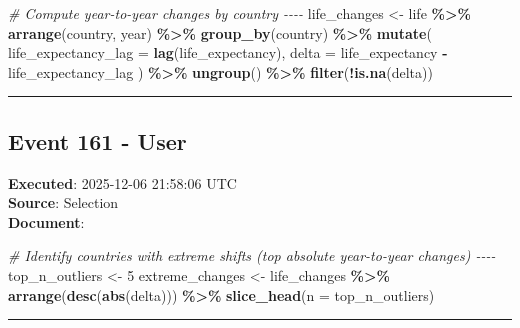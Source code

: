 \documentclass[
  11pt,
]{article}
\newenvironment{Shaded}{\begin{snugshade}}{\end{snugshade}}
\newcommand{\AttributeTok}[1]{\textcolor[rgb]{0.13,0.29,0.53}{#1}}
\newcommand{\CommentTok}[1]{\textcolor[rgb]{0.56,0.35,0.01}{\textit{#1}}}
\newcommand{\DecValTok}[1]{\textcolor[rgb]{0.00,0.00,0.81}{#1}}
\newcommand{\FunctionTok}[1]{\textcolor[rgb]{0.13,0.29,0.53}{\textbf{#1}}}
\newcommand{\NormalTok}[1]{#1}
\newcommand{\OtherTok}[1]{\textcolor[rgb]{0.56,0.35,0.01}{#1}}
\newcommand{\SpecialCharTok}[1]{\textcolor[rgb]{0.81,0.36,0.00}{\textbf{#1}}}
\begin{document}
\begin{Shaded}
\begin{Highlighting}[]
\CommentTok{\# Compute year{-}to{-}year changes by country {-}{-}{-}{-}}
\NormalTok{life\_changes }\OtherTok{\textless{}{-}}\NormalTok{ life }\SpecialCharTok{\%\textgreater{}\%}
  \FunctionTok{arrange}\NormalTok{(country, year) }\SpecialCharTok{\%\textgreater{}\%}
  \FunctionTok{group\_by}\NormalTok{(country) }\SpecialCharTok{\%\textgreater{}\%}
  \FunctionTok{mutate}\NormalTok{(}
    \AttributeTok{life\_expectancy\_lag =} \FunctionTok{lag}\NormalTok{(life\_expectancy),}
    \AttributeTok{delta =}\NormalTok{ life\_expectancy }\SpecialCharTok{{-}}\NormalTok{ life\_expectancy\_lag}
\NormalTok{  ) }\SpecialCharTok{\%\textgreater{}\%}
  \FunctionTok{ungroup}\NormalTok{() }\SpecialCharTok{\%\textgreater{}\%}
  \FunctionTok{filter}\NormalTok{(}\SpecialCharTok{!}\FunctionTok{is.na}\NormalTok{(delta))}
\end{Highlighting}
\end{Shaded}

\begin{center}\rule{0.5\linewidth}{0.5pt}\end{center}

\subsection{Event 161 - User}\label{event-161---user}

\textbf{Executed}: 2025-12-06 21:58:06 UTC\\
\textbf{Source}: Selection\\
\textbf{Document}:

\begin{Shaded}
\begin{Highlighting}[]
\CommentTok{\# Identify countries with extreme shifts (top absolute year{-}to{-}year changes) {-}{-}{-}{-}}
\NormalTok{top\_n\_outliers }\OtherTok{\textless{}{-}} \DecValTok{5}
\NormalTok{extreme\_changes }\OtherTok{\textless{}{-}}\NormalTok{ life\_changes }\SpecialCharTok{\%\textgreater{}\%}
  \FunctionTok{arrange}\NormalTok{(}\FunctionTok{desc}\NormalTok{(}\FunctionTok{abs}\NormalTok{(delta))) }\SpecialCharTok{\%\textgreater{}\%}
  \FunctionTok{slice\_head}\NormalTok{(}\AttributeTok{n =}\NormalTok{ top\_n\_outliers)}
\end{Highlighting}
\end{Shaded}

\begin{center}\rule{0.5\linewidth}{0.5pt}\end{center}
\end{document}
